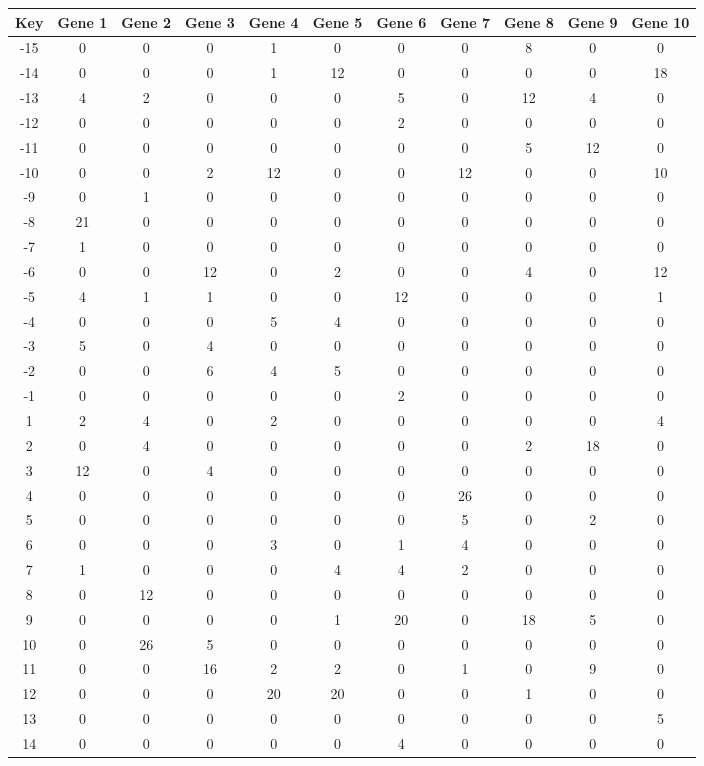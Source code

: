 \begin{tabular}{|c|c|c|c|c|c|c|c|c|c|c|}
\hline
Key & Gene 1 & Gene 2 & Gene 3 & Gene 4 & Gene 5 & Gene 6 & Gene 7 & Gene 8 & Gene 9 & Gene 10 \\
\hline
-15 & 0 & 0 & 0 & 1 & 0 & 0 & 0 & 8 & 0 & 0 \\
-14 & 0 & 0 & 0 & 1 & 12 & 0 & 0 & 0 & 0 & 18 \\
-13 & 4 & 2 & 0 & 0 & 0 & 5 & 0 & 12 & 4 & 0 \\
-12 & 0 & 0 & 0 & 0 & 0 & 2 & 0 & 0 & 0 & 0 \\
-11 & 0 & 0 & 0 & 0 & 0 & 0 & 0 & 5 & 12 & 0 \\
-10 & 0 & 0 & 2 & 12 & 0 & 0 & 12 & 0 & 0 & 10 \\
-9 & 0 & 1 & 0 & 0 & 0 & 0 & 0 & 0 & 0 & 0 \\
-8 & 21 & 0 & 0 & 0 & 0 & 0 & 0 & 0 & 0 & 0 \\
-7 & 1 & 0 & 0 & 0 & 0 & 0 & 0 & 0 & 0 & 0 \\
-6 & 0 & 0 & 12 & 0 & 2 & 0 & 0 & 4 & 0 & 12 \\
-5 & 4 & 1 & 1 & 0 & 0 & 12 & 0 & 0 & 0 & 1 \\
-4 & 0 & 0 & 0 & 5 & 4 & 0 & 0 & 0 & 0 & 0 \\
-3 & 5 & 0 & 4 & 0 & 0 & 0 & 0 & 0 & 0 & 0 \\
-2 & 0 & 0 & 6 & 4 & 5 & 0 & 0 & 0 & 0 & 0 \\
-1 & 0 & 0 & 0 & 0 & 0 & 2 & 0 & 0 & 0 & 0 \\
1 & 2 & 4 & 0 & 2 & 0 & 0 & 0 & 0 & 0 & 4 \\
2 & 0 & 4 & 0 & 0 & 0 & 0 & 0 & 2 & 18 & 0 \\
3 & 12 & 0 & 4 & 0 & 0 & 0 & 0 & 0 & 0 & 0 \\
4 & 0 & 0 & 0 & 0 & 0 & 0 & 26 & 0 & 0 & 0 \\
5 & 0 & 0 & 0 & 0 & 0 & 0 & 5 & 0 & 2 & 0 \\
6 & 0 & 0 & 0 & 3 & 0 & 1 & 4 & 0 & 0 & 0 \\
7 & 1 & 0 & 0 & 0 & 4 & 4 & 2 & 0 & 0 & 0 \\
8 & 0 & 12 & 0 & 0 & 0 & 0 & 0 & 0 & 0 & 0 \\
9 & 0 & 0 & 0 & 0 & 1 & 20 & 0 & 18 & 5 & 0 \\
10 & 0 & 26 & 5 & 0 & 0 & 0 & 0 & 0 & 0 & 0 \\
11 & 0 & 0 & 16 & 2 & 2 & 0 & 1 & 0 & 9 & 0 \\
12 & 0 & 0 & 0 & 20 & 20 & 0 & 0 & 1 & 0 & 0 \\
13 & 0 & 0 & 0 & 0 & 0 & 0 & 0 & 0 & 0 & 5 \\
14 & 0 & 0 & 0 & 0 & 0 & 4 & 0 & 0 & 0 & 0 \\
\hline
\end{tabular}